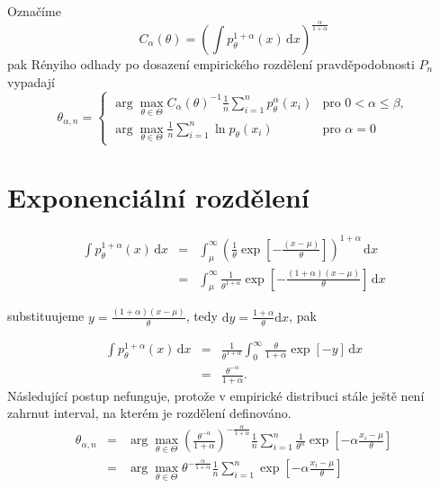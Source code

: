 \documentclass[11pt, a4paper]{article}
\newcommand{\intpa}{\int p_\theta^{1+\alpha}(x) \, \mathrm{d}x }
\newcommand{\fn}{\frac{1}{n} \sum_{i=1}^n p_{\theta}^{\alpha}\left( x_i \right)}
\newcommand{\fln}{\frac{1}{n} \sum_{i=1}^n \ln p_{\theta}\left( x_i \right)}
\newcommand{\Cat}{C_\alpha\left( \theta \right)}
\newcommand{\amtiT}{\arg \max_{\theta \in \Theta}}
\begin{document}
Označíme
\begin{equation}
	\Cat = \left( \intpa \right)^{\frac{\alpha}{1+\alpha}}
\end{equation}
pak Rényiho odhady po dosazení empirického rozdělení pravděpodobnosti $ P_n $ vypadají
\begin{equation}
	\theta_{\alpha,n} = 
	\begin{cases}
		\displaystyle{ \amtiT \Cat^{-1} \fn } & \text{pro } 0 < \alpha \leq \beta, \\
		\displaystyle{ \amtiT  \fln } & \text{pro } \alpha = 0
	\end{cases}	
\end{equation}



\section{Exponenciální rozdělení}

\begin{eqnarray}
\intpa & = & \int_{\mu }^{\infty } \left( {\frac{1}{\theta} \exp{ \left[ -\frac{(x -\mu )}{\theta } \right] }} \right) ^{1 + \alpha} \, \mathrm{d}x \nonumber\\
 & = & \int_{\mu }^{\infty } {\frac{1}{\theta^{ 1 + \alpha}} \exp{ \left[ -\frac{(1 + \alpha )(x -\mu )}{\theta } \right] }} \, \mathrm{d}x \nonumber
\end{eqnarray} 

substituujeme $ y = \frac{(1+\alpha)(x-\mu)}{\theta} $, tedy $\mathrm{d}y = \frac{1+\alpha}{\theta}\mathrm{d}x $, pak

\begin{eqnarray}
\intpa & = & \frac{1}{\theta^{ 1 + \alpha}} \int_{0}^{\infty } {\frac{\theta}{1+\alpha} \exp{ \left[ -y \right] }} \, \mathrm{d}x \nonumber\\
& = & \frac{\theta ^{-\alpha }}{1+\alpha }.
\end{eqnarray}
Následující postup nefunguje, protože v empirické distribuci stále ještě není zahrnut interval, na kterém je rozdělení definováno.
\begin{eqnarray}
	\theta_{\alpha,n} &= &\amtiT \left( \frac{\theta ^{-\alpha }}{1+\alpha } \right)^{-\frac{\alpha}{1+\alpha}} \frac{1}{n} \sum_{i=1}^n \frac{1}{\theta^\alpha} \exp \left[-\alpha\frac{x_i-\mu}{\theta} \right] \nonumber\\
	&=&\amtiT \theta^{-\frac{\alpha}{1+\alpha}} \frac{1}{n}\sum_{i=1}^n \exp \left[-\alpha\frac{x_i-\mu}{\theta} \right]
\end{eqnarray}
\end{document}
